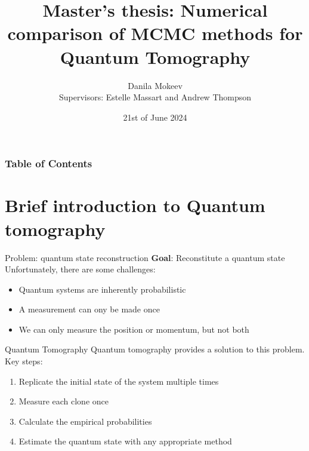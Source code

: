 \documentclass{beamer}
\title{Master's thesis: Numerical comparison of MCMC methods for Quantum Tomography}
\author[Mokeev]
{ Danila Mokeev\\{\small Supervisors: Estelle Massart and Andrew Thompson}}
\institute[EPL]{Ecole Polytechnique de Louvain}
\date{21st of June 2024}
\newcommand{\tb}{\textbf}
\begin{document}
\frame{\titlepage}

\begin{frame}
\frametitle{Table of Contents}
\tableofcontents
\end{frame}

\section{Brief introduction to Quantum tomography}
\begin{frame}{Problem: quantum state reconstruction}
    \tb{Goal}: Reconstitute a quantum state\medbreak
    Unfortunately, there are some challenges: 
    \begin{itemize}
        \item Quantum systems are inherently probabilistic
        \item A measurement can ony be made once
        \item We can only measure the position or momentum, but not both
    \end{itemize}
\end{frame}
\begin{frame}{Quantum Tomography}
    Quantum tomography provides a solution to this problem.\medbreak
    Key steps:
    \begin{enumerate}
        \item Replicate the initial state of the system multiple times
        \item Measure each clone once
        \item Calculate the empirical probabilities
        \item Estimate the quantum state with any appropriate method
    \end{enumerate}

\end{frame}
\end{document}
